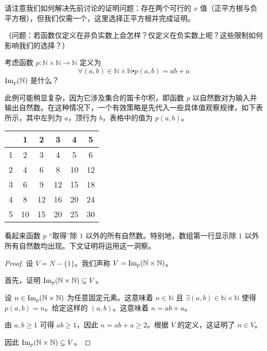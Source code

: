 请注意我们如何解决先前讨论的证明问题：存在两个可行的 $x$ 值（正平方根与负平方根），但我们仅需一个，这里选择正平方根并完成证明。

（问题：若函数仅定义在非负实数上会怎样？仅定义在负实数上呢？这些限制如何影响我们的选择？）

\begin{example}
    考虑函数 $p:\mathbb{N} \times \mathbb{N} \to \mathbb{N}$ 定义为
    \[\forall (a, b) \in \mathbb{N} \times \mathbb{N} \centerdot p(a, b) = ab + a\]
    $\text{Im}_p(\mathbb{N})$ 是什么？

    此例可能稍显复杂，因为它涉及集合的笛卡尔积，即函数 $p$ 以自然数对为输入并输出自然数。在这种情况下，一个有效策略是先代入一些具体值观察规律，如下表所示，其中左列为 $a$，顶行为 $b$，表格中的值为 $p(a,b)$。

    \begin{center}
        \begin{tabular}{c|ccccc}
              &  1 &  2 &  3 &  4 &  5 \\
            \hline
            1 &  2 &  3 &  4 &  5 &  6 \\
            2 &  4 &  6 &  8 & 10 & 12 \\
            3 &  6 &  9 & 12 & 15 & 18 \\
            4 &  8 & 12 & 16 & 20 & 24 \\
            5 & 10 & 15 & 20 & 25 & 30 \\
        \end{tabular}
    \end{center}

    看起来函数 $p$ ``取得''除 $1$ 以外的所有自然数。特别地，数组第一行显示除 $1$ 以外所有自然数均出现。下文证明将运用这一洞察。

    \begin{proof}
        设 $V = N - \{1\}$。我们声称 $V = \text{Im}_p(\mathbb{N} \times \mathbb{N})$。

        首先，证明 $\text{Im}_p(\mathbb{N} \times \mathbb{N}) \subseteq V$。

        设 $n \in \text{Im}_p(\mathbb{N} \times \mathbb{N})$ 为任意固定元素。这意味着 $n \in \mathbb{N}$ 且 $\exists (a,b) \in \mathbb{N} \times \mathbb{N}$ 使得 $p(a,b)=n$。给定这样的 $(a,b)$。这意味着 $n=ab+a$。
        
        由 $a,b \ge 1$ 可得 $ab \ge 1$，因此 $n = ab + a \ge 2$。根据 $V$ 的定义，这证明了 $n \in V$。

        因此 $\text{Im}_p(\mathbb{N} \times \mathbb{N}) \subseteq V$。


\end{proof}
\end{example}
